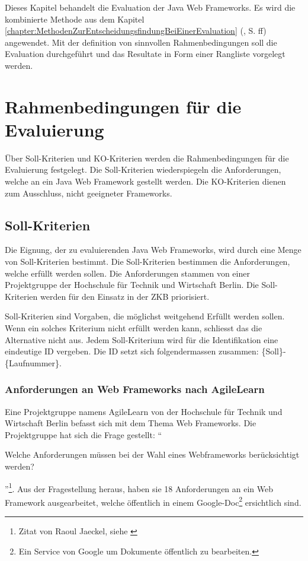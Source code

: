   Dieses Kapitel behandelt die Evaluation der Java Web Frameworks. Es wird die
  kombinierte Methode aus dem Kapitel 
  \ref{chapter:MethodenZurEntscheidungsfindungBeiEinerEvaluation}
  (, S.
  \pageref{chapter:MethodenZurEntscheidungsfindungBeiEinerEvaluation}ff)
  angewendet. Mit der definition von sinnvollen Rahmenbedingungen soll die
  Evaluation durchgeführt und das Resultate in Form einer Rangliste vorgelegt
  werden.
    
  \section{Rahmenbedingungen für die Evaluierung}
  
  Über Soll-Kriterien und KO-Kriterien werden die Rahmenbedingungen für die
  Evaluierung festgelegt. Die Soll-Kriterien wiederspiegeln die Anforderungen,
  welche an ein Java Web Framework gestellt werden. Die KO-Kriterien dienen zum
  Ausschluss, nicht geeigneter Frameworks.

  \subsection{Soll-Kriterien}
  
  Die Eignung, der zu evaluierenden Java Web Frameworks, wird durch eine Menge
  von Soll-Kriterien bestimmt. Die Soll-Kriterien bestimmen die Anforderungen,
  welche erfüllt werden sollen. Die Anforderungen stammen von einer
  Projektgruppe der Hochschule für Technik und Wirtschaft Berlin. Die
  Soll-Kriterien werden für den Einsatz in der \ac{ZKB} priorisiert.
  
  Soll-Kriterien sind Vorgaben, die möglichst weitgehend Erfüllt werden sollen.
  Wenn ein solches Kriterium nicht erfüllt werden kann, schliesst das die
  Alternative nicht aus. Jedem Soll-Kriterium wird für die Identifikation eine
  eindeutige ID vergeben. Die ID setzt sich folgendermassen zusammen: 
  \{Soll\}-\{Laufnummer\}.
  
  \subsubsection{Anforderungen an Web Frameworks nach AgileLearn}
  
  Eine Projektgruppe namens AgileLearn von der Hochschule für Technik und
  Wirtschaft Berlin befasst sich mit dem Thema Web Frameworks. Die
  Projektgruppe hat sich die Frage gestellt: ``\begin{itshape}Welche
  Anforderungen müssen bei der Wahl eines Webframeworks berücksichtigt
  werden?\end{itshape}''\footnote{Zitat von Raoul Jaeckel, siehe
  \cite{AnforderungenAnWebframeworks}}. Aus der Fragestellung heraus, haben sie
  18 Anforderungen an ein Web Framework ausgearbeitet, welche öffentlich in
  einem Google-Doc\footnote{Ein Service von Google um Dokumente öffentlich zu
  bearbeiten.} ersichtlich sind.
  
